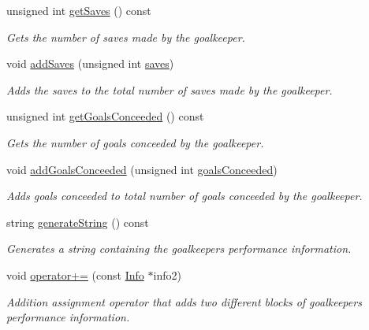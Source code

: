 \begin{DoxyCompactItemize}
unsigned int \hyperlink{class_info_g_k_a5690b8056b8f30b5127f99b46ef9a5d9}{get\+Saves} () const
\begin{DoxyCompactList}\small\item\em Gets the number of saves made by the goalkeeper. \end{DoxyCompactList}\item 
void \hyperlink{class_info_g_k_aa1535598fa29b199374a404dda8b73f2}{add\+Saves} (unsigned int \hyperlink{class_info_g_k_a0cd48fb9138effb26433639f12311794}{saves})
\begin{DoxyCompactList}\small\item\em Adds the saves to the total number of saves made by the goalkeeper. \end{DoxyCompactList}\item 
unsigned int \hyperlink{class_info_g_k_a069874de6c798b3237388f3dbdb14de1}{get\+Goals\+Conceeded} () const
\begin{DoxyCompactList}\small\item\em Gets the number of goals conceeded by the goalkeeper. \end{DoxyCompactList}\item 
void \hyperlink{class_info_g_k_aa29eeb0025487da9106007246478a0b5}{add\+Goals\+Conceeded} (unsigned int \hyperlink{class_info_g_k_a1380b4f12dffe7a8cadd23e06e5c645f}{goals\+Conceeded})
\begin{DoxyCompactList}\small\item\em Adds goals conceeded to total number of goals conceeded by the goalkeeper. \end{DoxyCompactList}\item 
string \hyperlink{class_info_g_k_a7bdc5a14f105385b4d856c8df7a4c7d0}{generate\+String} () const
\begin{DoxyCompactList}\small\item\em Generates a string containing the goalkeeper\textquotesingle{}s performance information. \end{DoxyCompactList}\item 
void \hyperlink{class_info_g_k_a1554aaf307cb45226fb26c6d6380a47e}{operator+=} (const \hyperlink{class_info}{Info} $\ast$info2)
\begin{DoxyCompactList}\small\item\em Addition assignment operator that adds two different blocks of goalkeeper\textquotesingle{}s performance information. \end{DoxyCompactList}\end{DoxyCompactItemize}
